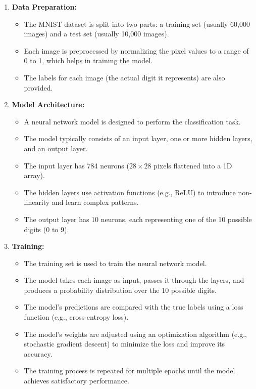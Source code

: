 \begin{enumerate}
  \item \textbf{Data Preparation:}
  \begin{itemize}
    \item The MNIST dataset is split into two parts: a training set (usually 60,000 images) and a test set (usually 10,000 images).
    \item Each image is preprocessed by normalizing the pixel values to a range of 0 to 1, which helps in training the model.
    \item The labels for each image (the actual digit it represents) are also provided.
  \end{itemize}

  \item \textbf{Model Architecture:}
  \begin{itemize}
    \item A neural network model is designed to perform the classification task.
    \item The model typically consists of an input layer, one or more hidden layers, and an output layer.
    \item The input layer has 784 neurons ($28 \times 28$ pixels flattened into a 1D array).
    \item The hidden layers use activation functions (e.g., ReLU) to introduce non-linearity and learn complex patterns.
    \item The output layer has 10 neurons, each representing one of the 10 possible digits (0 to 9).
  \end{itemize}

  \item \textbf{Training:}
  \begin{itemize}
    \item The training set is used to train the neural network model.
    \item The model takes each image as input, passes it through the layers, and produces a probability distribution over the 10 possible digits.
    \item The model's predictions are compared with the true labels using a loss function (e.g., cross-entropy loss).
    \item The model's weights are adjusted using an optimization algorithm (e.g., stochastic gradient descent) to minimize the loss and improve its accuracy.
    \item The training process is repeated for multiple epochs until the model achieves satisfactory performance.
  \end{itemize}


\end{enumerate}
